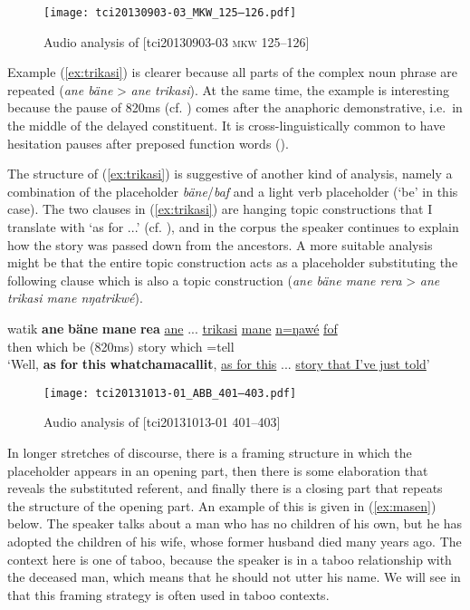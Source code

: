 \documentclass[output=paper,colorlinks,citecolor=brown]{langscibook}
\begin{document}
\begin{figure}
    \texttt{[image: tci20130903-03\_MKW\_125–126.pdf]}
    \caption{Audio analysis of [tci20130903-03 \textsc{mkw} 125--126]}
    \label{fig:doehler:gastol}
\end{figure}

Example (\ref{ex:trikasi}) is clearer because all parts of the complex noun phrase are repeated (\textit{ane bäne} > \textit{ane trikasi}). At the same time, the example is interesting because the pause of 820ms (cf. ) comes after the anaphoric demonstrative, i.e.\ in the middle of the delayed constituent. It is cross-linguistically common to have hesitation pauses after preposed function words (\cite[935]{Himmelmann:2014zj}).

The structure of (\ref{ex:trikasi}) is suggestive of another kind of analysis, namely a combination of the placeholder \textit{bäne}/\textit{baf} and a light verb placeholder (`be' in this case). The two clauses in (\ref{ex:trikasi}) are hanging topic constructions that I translate with `as for ...' (cf. \cite[337]{Dohler:2018qt}), and in the corpus the speaker continues to explain how the story was passed down from the ancestors. A more suitable analysis might be that the entire topic construction acts as a placeholder substituting the following clause which is also a topic construction (\textit{ane bäne mane rera} > \textit{ane trikasi mane nŋatrikwé}).

\ea \label{ex:trikasi}
    \gll watik \textbf{ane} \textbf{bäne} \textbf{mane} \textbf{rea} \uline{ane} ... \uline{trikasi} \uline{mane} \uline{n=ŋawé} \uline{fof}\\
    then   which be  (820ms) story which =tell \\
    \glt `Well, \textbf{as} \textbf{for} \textbf{this} \textbf{whatchamacallit}, \uline{as for this} ... \uline{story that I've just told}' 
\z

\begin{figure}
    \texttt{[image: tci20131013-01\_ABB\_401–403.pdf]}
    \caption{Audio analysis of [tci20131013-01  401--403]}
    \label{fig:doehler:trikasi}
\end{figure}

In longer stretches of discourse, there is a framing structure in which the placeholder appears in an opening part, then there is some elaboration that reveals the substituted referent, and finally there is a closing part that repeats the structure of the opening part. An example of this is given in (\ref{ex:masen}) below. The speaker talks about a man who has no children of his own, but he has adopted the children of his wife, whose former husband died many years ago. The context here is one of taboo, because the speaker is in a taboo relationship with the deceased man, which means that he should not utter his name. We will see in  that this framing strategy is often used in taboo contexts.
\end{document}
